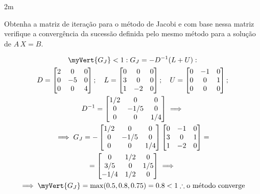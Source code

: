 \documentclass[CN_A-Tests_Resolutions.tex]{subfiles}
\begin{document}
\begin{questionBox}2m{} %

  Obtenha a matriz de iteração para o método de Jacobi e com base nessa matriz verifique a convergência da sucessão definida pelo mesmo método para a solução de \(A\,X=B\).

  \answer{}

  \begin{gather}
    \myVert{G_J}<1:
    G_J
    =-D^{-1}(L+U):\\
    D = \begin{bmatrix}
      2 & 0 & 0
      \\ 0 & -5 & 0
      \\ 0 & 0 & 4
    \end{bmatrix}
    ;\quad
    L = \begin{bmatrix}
      0 & 0 & 0
      \\ 3 & 0 & 0
      \\ 1 & -2 & 0
    \end{bmatrix}
    ;\quad
    U = \begin{bmatrix}
      0 & -1 & 0
      \\ 0 & 0 & 1
      \\ 0 & 0 & 0
    \end{bmatrix};
    \\
    D^{-1}=\begin{bmatrix}
      1/2 & 0 & 0
      \\ 0 & -1/5 & 0
      \\ 0 & 0 & 1/4
    \end{bmatrix}
    \implies \\
    \implies
    G_J
    = -\begin{bmatrix}
      1/2 & 0 & 0
      \\ 0 & -1/5 & 0
      \\ 0 & 0 & 1/4
    \end{bmatrix}
    \begin{bmatrix}
      0 & -1 & 0
      \\ 3 & 0 & 1
      \\ 1 & -2 & 0
    \end{bmatrix}
    = \\
    =\begin{bmatrix}
      0 & 1/2 & 0
      \\ 3/5 & 0 & 1/5
      \\ -1/4 & 1/2 & 0
    \end{bmatrix}
    \implies \\
    \implies
    \myVert{G_J}
    =\max(0.5,0.8,0.75)
    =0.8<1
    \therefore
    \text{o método converge}
  \end{gather}

\end{questionBox}
\end{document}
